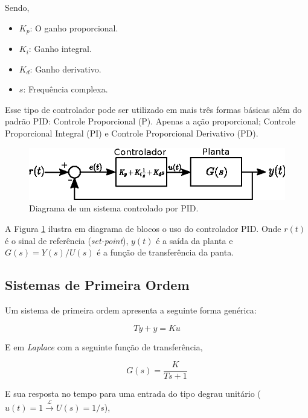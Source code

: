Sendo,

\begin{itemize}
    \item $K_p$: O ganho proporcional.
    \item $K_i$: Ganho integral.
    \item $K_d$: Ganho derivativo.
    \item $s$: Frequência complexa.
\end{itemize}

Esse tipo de controlador pode ser utilizado em mais três formas básicas além do padrão PID: Controle Proporcional (P). Apenas a ação proporcional; Controle Proporcional Integral (PI) e Controle Proporcional Derivativo (PD).

\begin{figure}[H]
    \centering
    \includegraphics[width=\textwidth]{figuras/ilustracoes/diagrama_controlador_PID.eps}
    \caption{Diagrama de um sistema controlado por PID.}
    \label{fig:diagrama_controlador_PID}
\end{figure}

A Figura \ref{fig:diagrama_controlador_PID} ilustra em diagrama de blocos o uso do controlador PID. Onde $r(t)$ é o sinal de referência (\emph{set-point}), $y(t)$ é a saída da planta e $G(s) = Y(s)/U(s)$ é a função de transferência da panta.

\subsection{Sistemas de Primeira Ordem}

Um sistema de primeira ordem apresenta a seguinte forma genérica:

\begin{equation}
    T\dot{y} + y = Ku
\end{equation}

E em \emph{Laplace} com a seguinte função de transferência,

\begin{equation}
    G(s) = \frac{K}{Ts + 1}
\end{equation}

E sua resposta no tempo para uma entrada do tipo degrau unitário ($u(t) = 1 \xrightarrow{\mathscr{L}} U(s) = 1/s$),

